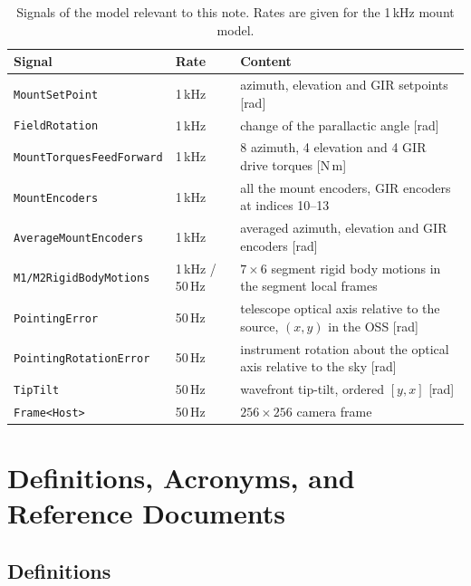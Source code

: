 \documentclass{gmto}
\numberwithin{table}{section}
\numberwithin{equation}{section}
\newcommand{\code}[1]{\texttt{#1}}
\begin{document}
\begin{table}[htbp]
  \centering
  \caption{Signals of the model relevant to this note. Rates are given for the 1\,kHz mount model.}
  \label{tab:signals}
  \begin{tabularx}{\linewidth}{llX}
    \toprule
    Signal                          & Rate     & Content \\
    \midrule
    \code{MountSetPoint}            & 1\,kHz   & azimuth, elevation and GIR setpoints [rad] \\
    \code{FieldRotation}            & 1\,kHz   & change of the parallactic angle [rad] \\
    \code{MountTorquesFeedForward}  & 1\,kHz   & 8 azimuth, 4 elevation and 4 GIR drive torques [N\,m] \\
    \code{MountEncoders}            & 1\,kHz   & all the mount encoders, GIR encoders at indices 10--13 \\
    \code{AverageMountEncoders}     & 1\,kHz   & averaged azimuth, elevation and GIR encoders [rad] \\
    \code{M1/M2RigidBodyMotions}    & 1\,kHz / 50\,Hz & $7\times 6$ segment rigid body motions in the segment local frames \\
    \code{PointingError}            & 50\,Hz   & telescope optical axis relative to the source, $(x,y)$ in the OSS [rad] \\
    \code{PointingRotationError}    & 50\,Hz   & instrument rotation about the optical axis relative to the sky [rad] \\
    \code{TipTilt}                  & 50\,Hz   & wavefront tip-tilt, ordered $[y,x]$ [rad] \\
    \code{Frame<Host>}              & 50\,Hz   & $256\times 256$ camera frame \\
    \bottomrule
  \end{tabularx}
\end{table}

\section{Definitions, Acronyms, and Reference Documents}
\label{sec:definitions-acronyms-references}

\subsection{Definitions}
\label{sec:definitions}
\end{document}
